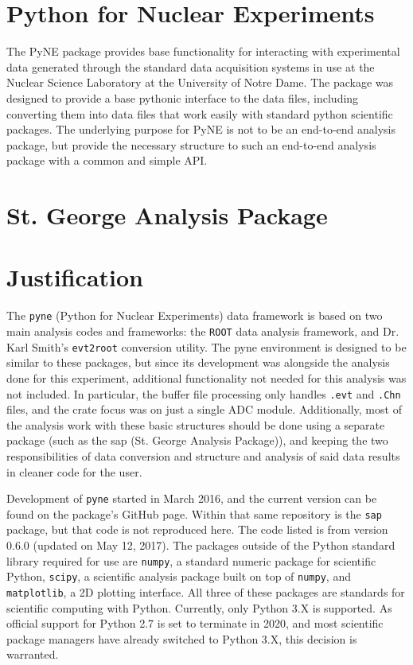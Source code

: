 \section{Python for Nuclear Experiments}

The PyNE package provides base functionality for interacting with experimental
data generated through the standard data acquisition systems in use at the
Nuclear Science Laboratory at the University of Notre Dame. The package was
designed to provide a base pythonic interface to the data files, including
converting them into data files that work easily with standard python
scientific packages. The underlying purpose for PyNE is not to be an end-to-end
analysis package, but provide the necessary structure to such an end-to-end
analysis package with a common and simple API.


\section{St. George Analysis Package}


\section{Justification}

The \texttt{pyne} (Python for Nuclear Experiments) data framework is
based on two main analysis codes and frameworks: the \texttt{ROOT} data
analysis framework, and Dr. Karl Smith's \texttt{evt2root} conversion
utility. The pyne environment is designed to be similar to these
packages, but since its development was alongside the analysis done for
this experiment, additional functionality not needed for this analysis
was not included. In particular, the buffer file processing only handles
\texttt{.evt} and \texttt{.Chn} files, and the crate focus was on just a
single ADC module. Additionally, most of the analysis work with these
basic structures should be done using a separate package (such as the
sap (St. George Analysis Package)), and keeping the two responsibilities
of data conversion and structure and analysis of said data results in
cleaner code for the user.

Development of \texttt{pyne} started in March 2016, and the current
version can be found on the package's GitHub page. Within that same
repository is the \texttt{sap} package, but that code is not reproduced
here. The code listed is from version 0.6.0 (updated on May 12, 2017).
The packages outside of the Python standard library required for use are
\texttt{numpy}, a standard numeric package for scientific Python,
\texttt{scipy}, a scientific analysis package built on top of
\texttt{numpy}, and \texttt{matplotlib}, a 2D plotting interface. All
three of these packages are standards for scientific computing with
Python. Currently, only Python 3.X is supported. As official support for
Python 2.7 is set to terminate in 2020, and most scientific package
managers have already switched to Python 3.X, this decision is
warranted.
